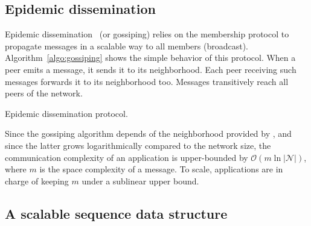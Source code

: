 

\subsection{Epidemic dissemination}
\label{subsec:gossiping}

Epidemic dissemination~\cite{birman1999bimodal,demers1987epidemic} (or
gossiping) relies on the membership protocol to propagate messages in a scalable
way to all members (broadcast).
Algorithm~\ref{algo:gossiping} shows the simple behavior of this
protocol. When a peer emits a message, it sends it to its neighborhood. Each
peer receiving such messages forwards it to its neighborhood too. Messages
transitively reach all peers of the network.

\begin{algorithm}[h]
  
  \caption{\label{algo:gossiping}Epidemic dissemination protocol.}
\end{algorithm}

Since the gossiping algorithm depends of the neighborhood provided by \SPRAY,
and since the latter grows logarithmically compared to the network size, the
communication complexity of an application is upper-bounded by
$\mathcal{O}(m \ln |\mathcal{N}|)$, where $m$ is the space complexity of a
message. To scale, applications are in charge of keeping $m$ under a sublinear
upper bound.




\subsection{A scalable sequence data structure}


